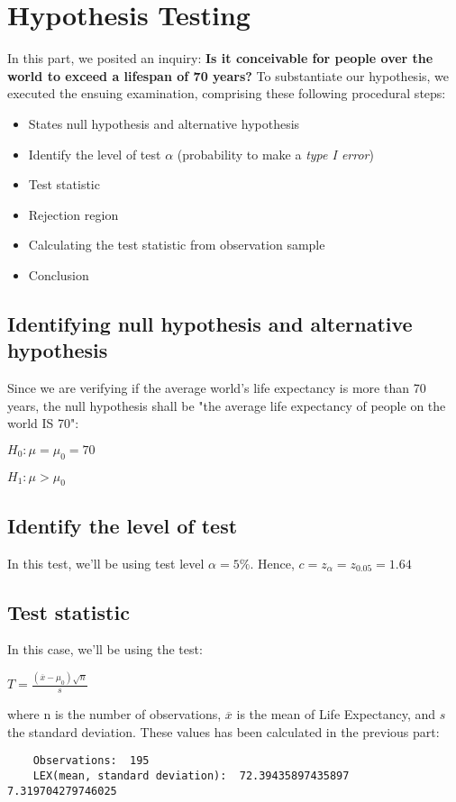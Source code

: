 \chapter{Hypothesis Testing}
\label{part2}

In this part, we posited an inquiry: \textbf{Is it conceivable for people over the world to exceed a lifespan of 70 years?} To substantiate our hypothesis, we executed the ensuing examination, comprising these following procedural steps:
\begin{itemize}
    \item States null hypothesis and alternative hypothesis
    \item Identify the level of test $\alpha$ (probability to make a \textit{type I error})
    \item Test statistic
    \item Rejection region
    \item Calculating the test statistic from observation sample
    \item Conclusion
\end{itemize}
\section{Identifying null hypothesis and alternative hypothesis}
Since we are verifying if the average world's life expectancy is more than 70 years, the null hypothesis shall be "the average life expectancy of people on the world IS 70":
\begin{center}
    $H_0: \mu = \mu_0 = 70$

    $H_1: \mu > \mu_0$
\end{center}

\section{Identify the level of test}
In this test, we'll be using test level $\alpha = 5\%$. Hence, $c = z_\alpha = z_{0.05} = 1.64$
\newpage
\section{Test statistic}
In this case, we'll be using the test:
\begin{center}
    {\fontsize{16}{20}\selectfont $T = \frac{(\overline{x} - \mu_0) \sqrt{n}}{s}$}
\end{center}
where n is the number of observations, $\overline{x}$ is the mean of Life Expectancy, and $s$ the standard deviation. These values has been calculated in the previous part:
\begin{verbatim}
    Observations:  195
    LEX(mean, standard deviation):  72.39435897435897 7.319704279746025
\end{verbatim}

